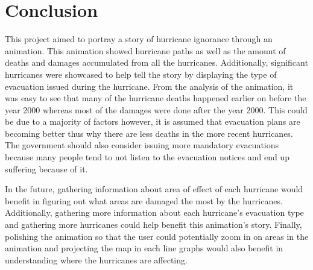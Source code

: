 \section{Conclusion}
\label{sec:conclusion}

This project aimed to portray a story of hurricane ignorance through an animation. This animation showed hurricane paths as well as the amount of deaths and damages accumulated from all the hurricanes. Additionally, significant hurricanes were showcased to help tell the story by displaying the type of evacuation issued during the hurricane. From the analysis of the animation, it was easy to see that many of the hurricane deaths happened earlier on before the year 2000 whereas most of the damages were done after the year 2000. This could be due to a majority of factors however, it is assumed that evacuation plans are becoming better thus why there are less deaths in the more recent hurricanes. The government should also consider issuing more mandatory evacuations because many people tend to not listen to the evacuation notices and end up suffering because of it.

In the future, gathering information about area of effect of each hurricane would benefit in figuring out what areas are damaged the most by the hurricanes. Additionally, gathering more information about each hurricane's evacuation type and gathering more hurricanes could help benefit this animation's story. Finally, polishing the animation so that the user could potentially zoom in on areas in the animation and projecting the map in each line graphs would also benefit in understanding where the hurricanes are affecting.